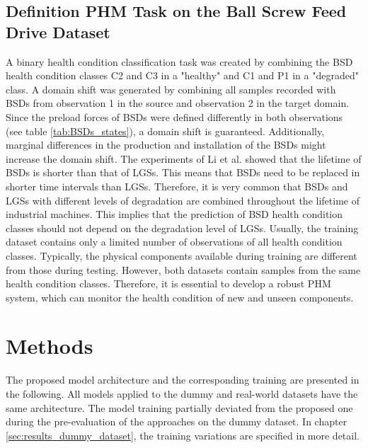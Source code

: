\subsection{Definition PHM Task on the Ball Screw Feed Drive Dataset}
A binary health condition classification task was created by combining the BSD health condition classes C2 and C3 in a "healthy" and C1 and P1 in a "degraded" class. A domain shift was generated by combining all samples recorded with BSDs from observation 1 in the source and observation 2 in the target domain. Since the preload forces of BSDs were defined differently in both observations (see table \ref{tab:BSDs_states}), a domain shift is guaranteed. Additionally, marginal differences in the production and installation of the BSDs might increase the domain shift. The experiments of Li et al. \cite{Li2018} showed that the lifetime of BSDs is shorter than that of LGSs. This means that BSDs need to be replaced in shorter time intervals than LGSs. Therefore, it is very common that BSDs and LGSs with different levels of degradation are combined throughout the lifetime of industrial machines. This implies that the prediction of BSD health condition classes should not depend on the degradation level of LGSs. Usually, the training dataset contains only a limited number of observations of all health condition classes. Typically, the physical components available during training are different from those during testing. However, both datasets contain samples from the same health condition classes. Therefore, it is essential to develop a robust PHM system, which can monitor the health condition of new and unseen components.

\section{Methods}\label{sec:methods}
The proposed model architecture and the corresponding training are presented in the following. All models applied to the dummy and real-world datasets have the same architecture. The model training partially deviated from the proposed one during the pre-evaluation of the approaches on the dummy dataset. In chapter \ref{sec:results_dummy_dataset}, the training variations are specified in more detail. 

